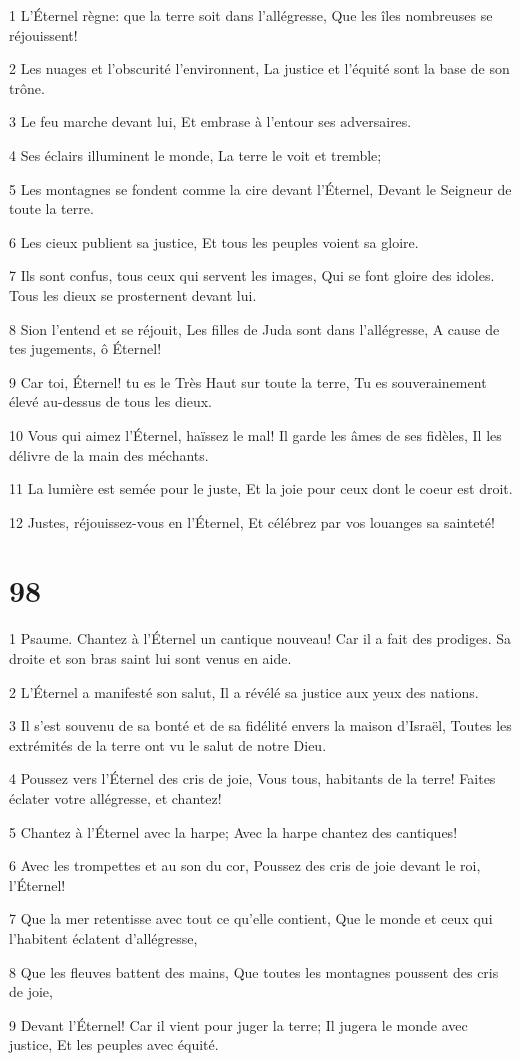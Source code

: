 \par 1 L'Éternel règne: que la terre soit dans l'allégresse, Que les îles nombreuses se réjouissent!
\par 2 Les nuages et l'obscurité l'environnent, La justice et l'équité sont la base de son trône.
\par 3 Le feu marche devant lui, Et embrase à l'entour ses adversaires.
\par 4 Ses éclairs illuminent le monde, La terre le voit et tremble;
\par 5 Les montagnes se fondent comme la cire devant l'Éternel, Devant le Seigneur de toute la terre.
\par 6 Les cieux publient sa justice, Et tous les peuples voient sa gloire.
\par 7 Ils sont confus, tous ceux qui servent les images, Qui se font gloire des idoles. Tous les dieux se prosternent devant lui.
\par 8 Sion l'entend et se réjouit, Les filles de Juda sont dans l'allégresse, A cause de tes jugements, ô Éternel!
\par 9 Car toi, Éternel! tu es le Très Haut sur toute la terre, Tu es souverainement élevé au-dessus de tous les dieux.
\par 10 Vous qui aimez l'Éternel, haïssez le mal! Il garde les âmes de ses fidèles, Il les délivre de la main des méchants.
\par 11 La lumière est semée pour le juste, Et la joie pour ceux dont le coeur est droit.
\par 12 Justes, réjouissez-vous en l'Éternel, Et célébrez par vos louanges sa sainteté!

\chapter{98}

\par 1 Psaume. Chantez à l'Éternel un cantique nouveau! Car il a fait des prodiges. Sa droite et son bras saint lui sont venus en aide.
\par 2 L'Éternel a manifesté son salut, Il a révélé sa justice aux yeux des nations.
\par 3 Il s'est souvenu de sa bonté et de sa fidélité envers la maison d'Israël, Toutes les extrémités de la terre ont vu le salut de notre Dieu.
\par 4 Poussez vers l'Éternel des cris de joie, Vous tous, habitants de la terre! Faites éclater votre allégresse, et chantez!
\par 5 Chantez à l'Éternel avec la harpe; Avec la harpe chantez des cantiques!
\par 6 Avec les trompettes et au son du cor, Poussez des cris de joie devant le roi, l'Éternel!
\par 7 Que la mer retentisse avec tout ce qu'elle contient, Que le monde et ceux qui l'habitent éclatent d'allégresse,
\par 8 Que les fleuves battent des mains, Que toutes les montagnes poussent des cris de joie,
\par 9 Devant l'Éternel! Car il vient pour juger la terre; Il jugera le monde avec justice, Et les peuples avec équité.

